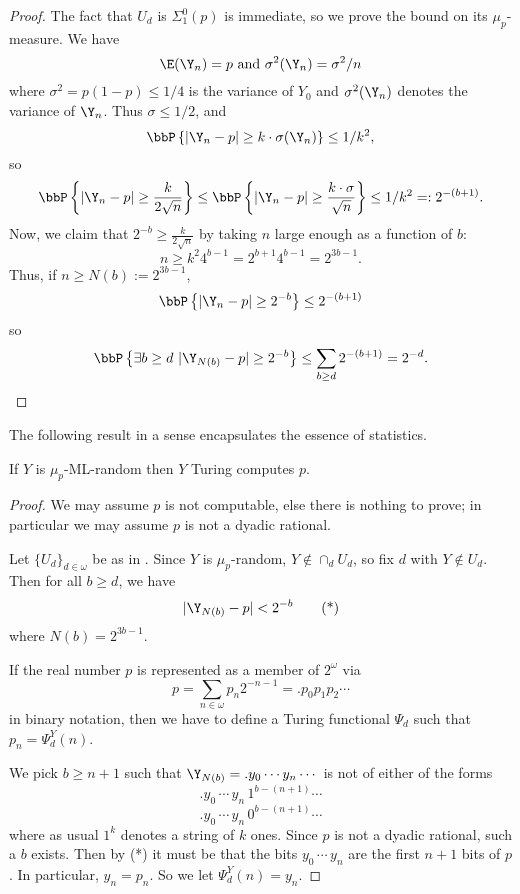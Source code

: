 \begin{proof}%
The fact that $U_d$ is $\Sigma^0_1(p)$ is immediate, so we prove the bound on its $\mu_p$-measure. We have 
\[
\E(\Y_n) = p \text{ and }\sigma^2(\Y_n) = \sigma^2/n
\]
where $\sigma^2=p(1-p)\le 1/4$ is the variance of $Y_0$ and $\sigma^2(\Y_n)$ denotes the variance of $\Y_n$. Thus $\sigma\le 1/2$, and
\[
\bbP\left\{|\Y_n-p|\ge k\cdot\sigma(\Y_n)\right\} \le 1/k^2,
\]
so 
\[
\bbP\left\{|\Y_n-p|\ge \frac{k}{2\sqrt{n}}\right\} \le
\bbP\left\{|\Y_n-p|\ge \frac{k\cdot\sigma}{\sqrt{n}}\right\} \le 1/k^2 =: 2^{-(b+1)}.
\]
Now, we claim that $2^{-b}\ge\frac{k}{2\sqrt{n}}$ by taking $n$ large enough as a function of $b$:
\[
n\ge k^2 4^{b-1}=2^{b+1}4^{b-1}=2^{3b-1}.
\]
Thus, if $n\ge N(b):=2^{3b-1}$, 
\[
\bbP\left\{|\Y_n-p|\ge 2^{-b}\right\} \le 2^{-(b+1)}
\]
so
\[
\bbP\left\{\exists b\ge d\,\,|\Y_{N(b)}-p|\ge 2^{-b}\right\} \le \sum_{b\ge d} 2^{-(b+1)}=2^{-d}.
\]
\end{proof}

The following result in a sense encapsulates the essence of statistics.

\begin{theorem}\label{logicbike} %
	If $Y$ is $\mu_p$-ML-random then $Y$ Turing computes $p$. 
\end{theorem}
\begin{proof}
We may assume $p$ is not computable, else there is nothing to prove; in particular we may assume $p$ is not a dyadic rational.

Let $\{U_d\}_{d\in\omega}$ be as in . Since $Y$ is $\mu_p$-random, $Y\not\in\cap_d U_d$, so fix $d$ with $Y\not\in U_d$. Then for all $b\ge d$, we have
\[
|\Y_{N(b)}-p|< 2^{-b} \tag{*}
\]
where $N(b)=2^{3b-1}$. 

If the real number $p$ is represented as a member of $2^\omega$ via
\[
p = \sum_{n\in\omega} p_n 2^{-n-1} = .p_0 p_1 p_2\cdots
\]
in binary notation, then we have to define a Turing functional $\Psi_d$ such that $p_n=\Psi_d^Y(n)$.

We pick $b\ge n+1$ such that $\Y_{N(b)}=.y_0\cdots y_n\cdots$ is not of either of the forms
\[
.y_0\,\cdots \,y_{n} \,1^{b-(n+1)} \cdots
\]
\[
.y_0\,\cdots \,y_{n} \,0^{b-(n+1)} \cdots
\]
where as usual $1^k$ denotes a string of $k$ ones.
Since $p$ is not a dyadic rational, such a $b$ exists. Then by (*) it must be that the bits $y_0\,\cdots\,y_{n}$ are the first $n+1$ bits of $p$. In particular, $y_n=p_n$. So we let $\Psi_d^Y(n)=y_n$.
\end{proof}


